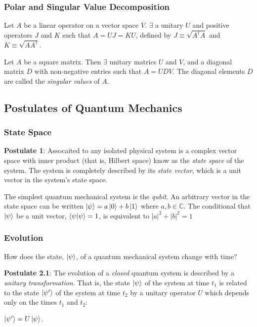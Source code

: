 \documentclass{article}
\begin{document}
\subsubsection{Polar and Singular Value Decomposition}
Let $A$ be a linear operator on a vector space $V$. $\exists$ a unitary $U$
and positive operators $J$ and $K$ such that $A = UJ = KU$, defined by
$J \equiv \sqrt{A^{\dagger}A}$ and $K \equiv \sqrt{AA^{\dagger}}$.

Let $A$ be a square matrix. Then $\exists$ unitary matrics $U$ and $V$, and a
diagonal matrix $D$ with non-negative entries such that $A = UDV$. The
diagonal elements $D$ are called the \emph{singular values} of $A$.

\subsection{Postulates of Quantum Mechanics}
\subsubsection{State Space}
\textbf{Postulate 1}: Assocaited to any isolated physical system is a complex
vector space with inner product (that is, Hilbert space) know as the
\emph{state space} of the system. The system is completely described by its
\emph{state vector}, which is a unit vector in the system's state space.

The simplest quantum mechanical system is the \emph{qubit}. An arbitrary
vector in the state space can be written $\ket{\psi} = a\ket{0} + b\ket{1}$
where $a, b \in \mathbb{C}$. The conditional that $\ket{\psi}$ be a unit
vector, $\bra{\psi}\ket{\psi} = 1$, is equivalent to
$|a|^{2} + |b|^{2} = 1$

\subsubsection{Evolution}
How does the state, $\ket{\psi}$, of a quantum mechanical system change with
time?

\textbf{Postulate 2.1}: The evolution of a \emph{closed} quantum system is
described by a \emph{unitary transformation}. That is, the state
$\ket{\psi}$ of the system at time $t_{1}$ is related to the state
$\ket{\psi'}$ of the system at time $t_{2}$ by a unitary operator
$U$ which depends only on the times $t_{1}$ and $t_{2}$:
  \begin{center}
    $\ket{\psi'} = U\ket{\psi}$.
  \end{center}
\end{document}
